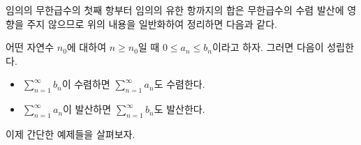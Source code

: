 \documentclass[11pt, a4paper]{book}
\begin{document}
 임의의 무한급수의 첫째 항부터 임의의 유한 항까지의 합은 무한급수의 수렴 발산에 영향을 주지 않으므로 위의 내용을 일반화하여 정리하면 다음과 같다.
 \vspace{1em}
 
 \begin{theorem}[비교판정법]
  어떤 자연수 $n_{0}$에 대하여 $n\ge n_{0}$일 때 $0 \le a_{n} \le b_{n}$이라고 하자. 그러면 다음이 성립한다.
 	\begin{itemize}
 		\item $\displaystyle \sum_{n=1}^{\infty}b_{n}$이 수렴하면 $\displaystyle \sum_{n=1}^{\infty}a_{n}$도 수렴한다.
 		\item $\displaystyle \sum_{n=1}^{\infty}a_{n}$이 발산하면 $\displaystyle \sum_{n=1}^{\infty}b_{n}$도 발산한다.
 	\end{itemize}
 	\end{theorem}
 \vspace{1em}
 이제 간단한 예제들을 살펴보자.
 
\end{document}
